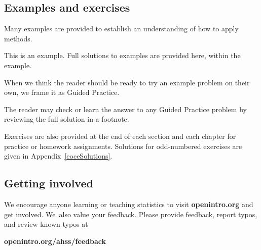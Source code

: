 \vspace{3mm}

\subsection*{{\color{oiB}Examples and exercises}}

\noindent%
Many examples are provided to establish an understanding of how
to apply methods.

\begin{examplewrap}
\begin{nexample}{This is an example.}
  Full solutions to examples are provided here, within the example.
\end{nexample}
\end{examplewrap}

\noindent%
When we think the reader should be ready to try an example problem
on their own, we frame it as Guided Practice.

\begin{exercisewrap}
\begin{nexercise}
The reader may check or learn the answer to any Guided Practice
problem by reviewing the full solution in a footnote.\footnotemark{}
\end{nexercise}
\end{exercisewrap}

\noindent%
Exercises are also provided at the end of each section
and each chapter for practice or homework assignments.  
Solutions for odd-numbered exercises are given in
Appendix~\ref{eoceSolutions}.

\subsection*{{\color{oiB}Getting involved}}
We encourage anyone learning or teaching statistics to visit
    {\color{black}\textbf{openintro.org}}
and get involved.
We~also value your feedback.
Please provide feedback, report typos, and review known typos at
\begin{center}
    {\color{black}\textbf{openintro.org/ahss/feedback}}
\end{center}


